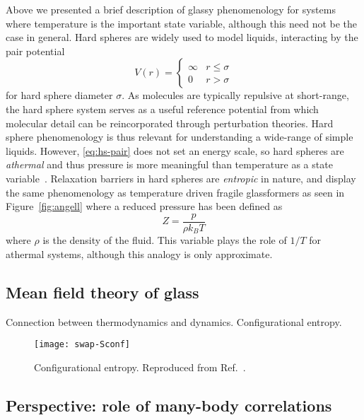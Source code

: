 Above we presented a brief description of glassy phenomenology for systems where temperature is the important state variable, although this need not be the case in general.
Hard spheres are widely used to model liquids, interacting by the pair potential
\begin{equation}\label{eq:hs-pair}
  V(r) = \left\{
  \begin{array}{lr}
    \infty & r \le \sigma \\
    0 & r > \sigma
  \end{array}
  \right.
\end{equation}
for hard sphere diameter $\sigma$. 
As molecules are typically repulsive at short-range, the hard sphere system serves as a useful reference potential from which molecular detail can be reincorporated through perturbation theories.
Hard sphere phenomenology is thus relevant for understanding a wide-range of simple liquids.
However, \eqref{eq:hs-pair} does not set an energy scale, so hard spheres are \emph{athermal} and thus pressure is more meaningful than temperature as a state variable~\cite{Berthier2009}.
Relaxation barriers in hard spheres are \emph{entropic} in nature, and display the same phenomenology as temperature driven fragile glassformers as seen in Figure~\ref{fig:angell} where a reduced pressure has been defined as
\begin{equation}\label{eq:reduced-P}
  Z = \frac{p}{\rho k_B T}
\end{equation}
where $\rho$ is the density of the fluid. This variable plays the role of $1/T$ for athermal systems, although this analogy is only approximate.

\subsection{Mean field theory of glass}

Connection between thermodynamics and dynamics.
Configurational entropy.

\begin{SCfigure}
  \texttt{[image: swap-Sconf]}
  \caption[Configurational entropy in hard spheres from Monte-Carlo simulations]{
    Configurational entropy.
    Reproduced from Ref.\ \cite{BerthierPNAS2017}.
  }
\end{SCfigure}

\subsection{Perspective: role of many-body correlations}

